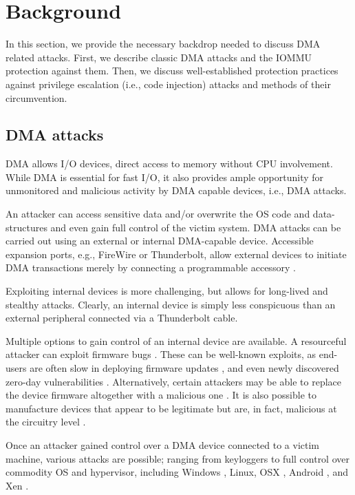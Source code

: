 \section{Background}

In this section, we provide the necessary backdrop needed to discuss DMA related attacks. First, we describe classic DMA attacks and the IOMMU protection against them. Then, we discuss well-established protection practices against privilege escalation (i.e., code injection) attacks and methods of their circumvention.

\subsection{DMA attacks}

DMA allows I/O devices, direct access to memory \cite{oC54} without CPU involvement. While DMA is essential for fast I/O, it also provides ample opportunity for unmonitored and malicious activity by DMA capable devices, i.e., DMA attacks. 

An attacker can access sensitive data and/or overwrite the OS code and data-structures and even gain full control of the victim system. DMA attacks can be carried out using an external or internal DMA-capable device. Accessible expansion ports, e.g., FireWire or Thunderbolt, allow external devices to initiate DMA transactions merely by connecting a programmable accessory \cite{Dor04, Vol, MM, thunder}. 

Exploiting internal devices is more challenging, but allows for long-lived and stealthy attacks. Clearly, an internal device is simply less conspicuous than an external peripheral connected via a Thunderbolt cable.

Multiple options to gain control of an internal device are available. A resourceful attacker can exploit firmware bugs \cite{SB12}. These can be well-known exploits, as end-users are often slow in deploying firmware updates \cite{DPVL10}, and even newly discovered zero-day vulnerabilities \cite{Ben17b}. Alternatively, certain attackers may be able to replace the device firmware altogether with a malicious one \cite{ZKB13, NL14}. It is also possible to manufacture devices that appear to be legitimate but are, in fact, malicious at the circuitry level \cite{YHD16}.

Once an attacker gained control over a DMA device connected to a victim machine, various attacks are possible; ranging from keyloggers \cite{LKV13, SB12} to full control over commodity OS and hypervisor, including Windows \cite{AD10,thunder}, Linux, OSX \cite{Fri16, thunder}, Android \cite{Ben17b}, and Xen \cite{Woj08}.

